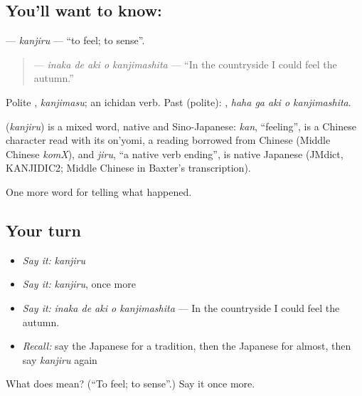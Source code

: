 \subsection*{You'll want to know: }
\textbf{} — \emph{kanjiru} — \textquotedblleft{}to feel; to sense\textquotedblright{}.

\begin{quote}
\textbf{  } — \emph{inaka de aki o kanjimashita} — \textquotedblleft{}In the countryside I could feel the autumn.\textquotedblright{}
\end{quote}

Polite \textbf{}, \emph{kanjimasu}; an ichidan verb. Past (polite): \textbf{  }, \emph{haha ga aki o kanjimashita}.

\begin{cousinweb}
\textbf{} (\emph{kanjiru}) is a mixed word, native and Sino-Japanese: \emph{kan}, \textquotedblleft{}feeling\textquotedblright{}, is a Chinese character read with its on'yomi, a reading borrowed from Chinese (Middle Chinese \emph{komX}), and \emph{jiru}, \textquotedblleft{}a native verb ending\textquotedblright{}, is native Japanese (JMdict, KANJIDIC2; Middle Chinese in Baxter's transcription).
\end{cousinweb}

\begin{grammarlens}[title={What you've built}]
One more word for telling what happened.
\end{grammarlens}

\subsection*{Your turn}
\begin{itemize}
\raggedright
  \item \emph{Say it:} \emph{kanjiru}
  \item \emph{Say it:} \emph{kanjiru}, once more
  \item \emph{Say it:} \emph{inaka de aki o kanjimashita} — In the countryside I could feel the autumn.
  \item \emph{Recall:} say the Japanese for a tradition, then the Japanese for almost, then say \emph{kanjiru} again
\end{itemize}

\begin{tcolorbox}[breakable,colback=teal!4,colframe=teal!35!black,title={Before you move on}]
What does  mean? (\textquotedblleft{}To feel; to sense\textquotedblright{}.) Say it once more.
\end{tcolorbox}
